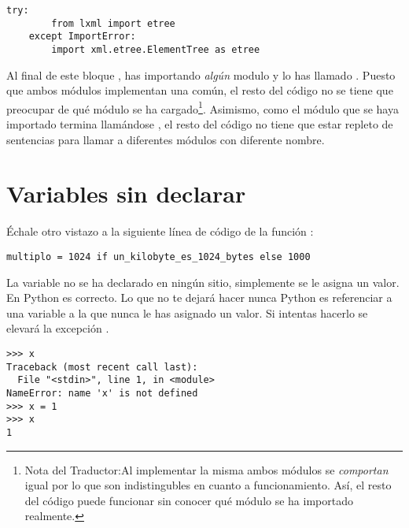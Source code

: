 \noindent\begin{minipage}{\textwidth}
\begin{lstlisting}[mathescape=True]
    try:
        from lxml import etree
    except ImportError:
        import xml.etree.ElementTree as etree
\end{lstlisting}
\end{minipage}

Al final de este bloque , has importando \emph{algún} modulo y lo has llamado . Puesto que ambos módulos implementan una  común, el resto del código no se tiene que preocupar de qué módulo se ha cargado\footnote{Nota del Traductor:Al implementar la misma  ambos módulos se \emph{comportan} igual por lo que son indistingubles en cuanto a funcionamiento. Así, el resto del código puede funcionar sin conocer qué módulo se ha importado realmente.}. Asimismo, como el módulo que se haya importado termina llamándose , el resto del código no tiene que estar repleto de sentencias  para llamar a diferentes módulos con diferente nombre.

\section{Variables sin declarar}

Échale otro vistazo a la siguiente línea de código de la función :

\noindent\begin{minipage}{\textwidth}
\begin{lstlisting}[mathescape=True]
    multiplo = 1024 if un_kilobyte_es_1024_bytes else 1000
\end{lstlisting}
\end{minipage}

La variable  no se ha declarado en ningún sitio, simplemente se le asigna un valor. En Python es correcto. Lo que no te dejará hacer nunca Python es referenciar a una variable a la que nunca le has asignado un valor. Si intentas hacerlo se elevará la excepción .

\noindent\begin{minipage}{\textwidth}
\begin{lstlisting}[mathescape=True]
>>> x
Traceback (most recent call last):
  File "<stdin>", line 1, in <module>
NameError: name 'x' is not defined
>>> x = 1
>>> x
1
\end{lstlisting}
\end{minipage}

